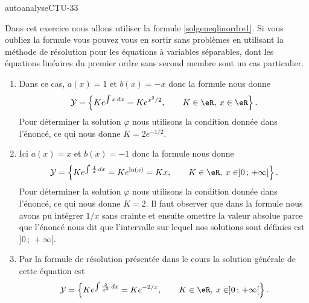 
\begin{corrige}{autoanalyseCTU-33}

Dans cet exercice nous allons utiliser la formule \eqref{solgeneqlinordre1}. Si vous oubliez la formule vous pouvez vous en sortir sans problèmes en utilisant la méthode de résolution pour les équations à variables séparables, dont les équations linéaires du premier ordre sans second membre sont un cas particulier. 
\begin{enumerate}
\item Dans ce cas, $a(x) = 1$ et $b(x) = -x $ donc la formule nous donne 
\[
\mathcal{Y} = \left\{K e^{\int x\,dx} = K e^{x^2/2}, \qquad K \in \eR, \:x\in \eR\right\}.
\]
Pour déterminer la solution $\varphi$ nous utilisons la condition donnée dans l'énoncé, ce qui nous donne $K =  2e^{-1/2}$.
\item Ici $a(x) = x$ et $b(x) = -1 $ donc la formule nous donne 
\[
\mathcal{Y} = \left\{K e^{\int \frac{1}{x}\,dx} = K e^{\ln(x)} = Kx , \qquad K \in \eR, \:x\in ]0\,;\,+\infty[\right\}. 
\]
Pour déterminer la solution $\varphi$ nous utilisons la condition donnée dans l'énoncé, ce qui nous donne $K = 2$. Il faut observer que dans la formule nous avons pu intégrer $1/x$ sans crainte et ensuite omettre la valeur absolue parce que l'énoncé nous dit que l'intervalle sur lequel nos solutions sont définies est  $]0\,;\,+\infty[$.
\item Par la formule de résolution présentée dans le cours la solution générale de cette équation est 
\[
\mathcal{Y} =\left\{ K e^{\int \frac{2}{x^2}\,dx} = K e^{-2/x}, \qquad K \in \eR, \:x\in ]0\,;\,+\infty[ \right\}.
\]
\end{enumerate}


\end{corrige}   
